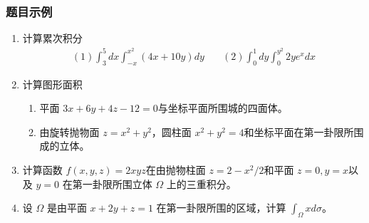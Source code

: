 \subsubsection{题目示例}
\begin{enumerate}
    \item 计算累次积分
    \begin{align*}
        (1) \int_3^5dx\int_{-x}^{x^2}(4x+10y)dy \quad & (2) \int_0^1dy\int_0^{y^2}2ye^xdx
    \end{align*}

    \item 计算图形面积
        \begin{enumerate}[(1)]
             \item 平面 $3x + 6y + 4z -12=0$与坐标平面所围城的四面体。
             \item 由旋转抛物面 $z = x^2 + y^2$，圆柱面 $x^2 + y^2 =4$和坐标平面在第一卦限所围成的立体。
         \end{enumerate}

    \item 计算函数 $f(x,y,z)=2xyz$在由抛物柱面 $z=2-x^2/2$和平面 $z=0, y=x$以及 $y=0$ 在第一卦限所围立体 $\Omega$ 上的三重积分。

    \item 设 $\Omega$ 是由平面 $x+2y+z=1$ 在第一卦限所围的区域，计算 $\int _ \Omega x d \sigma$。
\end{enumerate}

